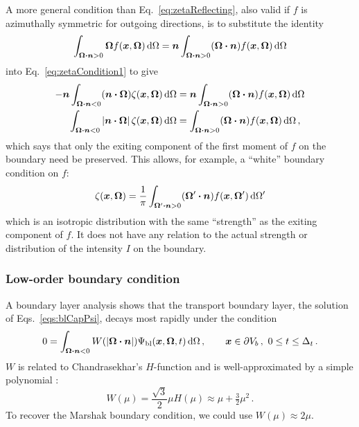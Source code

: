 A more general condition than Eq.~\eqref{eq:zetaReflecting}, also valid if $f$ is
azimuthally symmetric for outgoing directions, is to substitute the identity
\begin{equation*}
  \int_{\bm{\Omega} \bm{\cdot} \bm{n} > 0}
  \bm{\Omega} f(\bm{x}, \bm{\Omega})\mathop{}\!\mathrm{d}\Omega
  = \bm{n} 
  \int_{\bm{\Omega} \bm{\cdot} \bm{n} > 0}
  (\bm{\Omega} \bm{\cdot} \bm{n} ) f(\bm{x}, \bm{\Omega}) \mathop{}\!\mathrm{d}\Omega
\end{equation*}
into Eq.~\eqref{eq:zetaCondition1} to give
\begin{align} \nonumber
  -\bm{n} \int_{\bm{\Omega} \bm{\cdot} \bm{n} < 0}
  (\bm{n} \bm{\cdot} \bm{\Omega}) \zeta(\bm{x}, \bm{\Omega})\mathop{}\!\mathrm{d}\Omega
  &= \bm{n} \int_{\bm{\Omega} \bm{\cdot} \bm{n} > 0}
  (\bm{\Omega} \bm{\cdot} \bm{n} ) f(\bm{x}, \bm{\Omega}) \mathop{}\!\mathrm{d}\Omega
\\ \label{eq:zetaGeneral}
  \int_{\bm{\Omega} \bm{\cdot} \bm{n} < 0}
  \left| \bm{n} \bm{\cdot} \bm{\Omega} \right| \zeta(\bm{x}, \bm{\Omega}) \mathop{}\!\mathrm{d}\Omega
  &= \int_{\bm{\Omega} \bm{\cdot} \bm{n} > 0}
  (\bm{\Omega} \bm{\cdot} \bm{n} ) f(\bm{x}, \bm{\Omega}) \mathop{}\!\mathrm{d}\Omega\,,
\end{align}
which says that only the exiting component of the first moment of $f$ on the
boundary need be preserved. This allows, for example, a ``white'' boundary
condition on $f$:
\begin{equation}\label{eq:zetaWhite}
  \zeta(\bm{x}, \bm{\Omega})
  = \frac{1}{\pi} \int_{\bm{\Omega}' \bm{\cdot} \bm{n} > 0}
  (\bm{\Omega}' \bm{\cdot} \bm{n} ) f(\bm{x}, \bm{\Omega}') \mathop{}\!\mathrm{d}\Omega'
\end{equation}
which is an isotropic distribution with the same ``strength'' as the exiting
component of $f$. It does not have any relation to the actual strength or
distribution of the intensity $I$ on the boundary.


\subsubsection{Low-order boundary condition}
A boundary layer analysis \cite{Mal1991}
shows that the transport boundary layer, the solution of
Eqs.~\eqref{eqs:blCapPsi}, decays most rapidly under the condition
\begin{equation} \label{eq:bcW}
  0 = \int_{\bm{\Omega} \bm{\cdot} \bm{n} < 0} W(\left| \bm{\Omega} \bm{\cdot} \bm{n} \right|)
  \Psi_\mathrm{bl} (\bm{x}, \bm{\Omega}, t) \mathop{}\!\mathrm{d} \Omega\,,\qquad \bm{x} \in
  \partial V_b\,,\ 0 \le t \le \Delta_t\,.
\end{equation}
$W$ is related to Chandrasekhar's $H$-function \cite{Cha1960} and is
well-approximated by a simple polynomial \cite{Mal1991}:
\begin{equation} \label{eq:chandraW}
  W(\mu) = \frac{\sqrt{3}}{2} \mu H(\mu)
  \approx \mu + \tfrac{3}{2} \mu^2 \,.
\end{equation}
To recover the Marshak boundary condition, we could use $W(\mu) \approx 2 \mu$.

